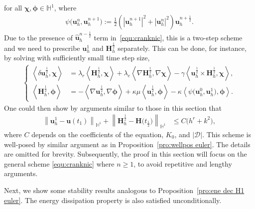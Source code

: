 \documentclass[11pt, reqno]{amsart}
\theoremstyle{definition}
\theoremstyle{remark}
\numberwithin{equation}{section}
\newcommand{\bff}{\boldsymbol}
\newcommand{\bb}{\mathbb}
\newcommand{\norm}[2]{\left\|{#1}\right\|_{#2}}
\newcommand{\inpro}[2]{\left\langle#1,#2\right\rangle}
\newcommand{\abs}[1]{\left|{#1}\right|}
\begin{document}
for all $\bff{\chi}, \bff{\phi}\in \bb{H}^1$, where
\begin{align}\label{equ:psi un}
	\psi \big(\bff{u}_h^n, \bff{u}_h^{n+1}\big)
	:=
	\frac{1}{2} \left(\abs{\bff{u}_h^{n+1}}^2 + \abs{\bff{u}_h^n}^2\right) \bff{u}_h^{n+\frac{1}{2}}.
\end{align} 
Due to the presence of $\widehat{\bff{u}}_h^{n-\frac{1}{2}}$ term in~\eqref{equ:cranknic}, this is a two-step scheme and we need to prescribe $\bff{u}_h^1$ and $\bff{H}_h^{\frac{1}{2}}$ separately. This can be done, for instance, by solving with sufficiently small time step size,
\begin{align}\label{equ:cranknic first}
	\left\{
	\begin{alignedat}{1}
		\inpro{\delta \bff{u}_h^{\frac{1}{2}}}{\bff{\chi}}
		&=
		\lambda_r \inpro{\bff{H}_h^{\frac{1}{2}}}{\bff{\chi}}
		+
		\lambda_e \inpro{\nabla \bff{H}_h^{\frac{1}{2}}}{\nabla \bff{\chi}}
		-
		\gamma \inpro{{\bff{u}}_h^{\frac{1}{2}} \times \bff{H}_h^{\frac{1}{2}}}{\bff{\chi}},
		\\
		\inpro{\bff{H}_h^{\frac{1}{2}}}{\bff{\phi}} 
		&=
		-
		\inpro{\nabla \bff{u}_h^{\frac{1}{2}}}{\nabla \bff{\phi}}
		+
		\kappa \mu \inpro{\bff{u}_h^{\frac{1}{2}}}{\bff{\phi}}
		-
		\kappa \inpro{\psi \big(\bff{u}_h^0, \bff{u}_h^1\big)}{\bff{\phi}}.
	\end{alignedat}
	\right.
\end{align}
One could then show by arguments similar to those in this section that 
\begin{align*}
	\norm{\bff{u}_h^1- \bff{u}(t_1)}{\bb{H}^1} + \norm{\bff{H}_h^{\frac{1}{2}}- \bff{H}\big(t_{\frac{1}{2}}\big)}{\bb{H}^1} &\leq C \big(h^{r}+k^2 \big),
\end{align*}
where $C$ depends on the coefficients of the equation, $K_0$, and $|\mathscr{D}|$. This scheme is well-posed by similar argument as in Proposition~\ref{pro:wellpos euler}. The details are omitted for brevity. Subsequently, the proof in this section will focus on the general scheme \eqref{equ:cranknic} where $n\geq 1$, to avoid repetitive and lengthy arguments.

Next, we show some stability results analogous to Proposition~\ref{pro:ene dec H1 euler}. The energy dissipation property is also satisfied unconditionally.
\end{document}
